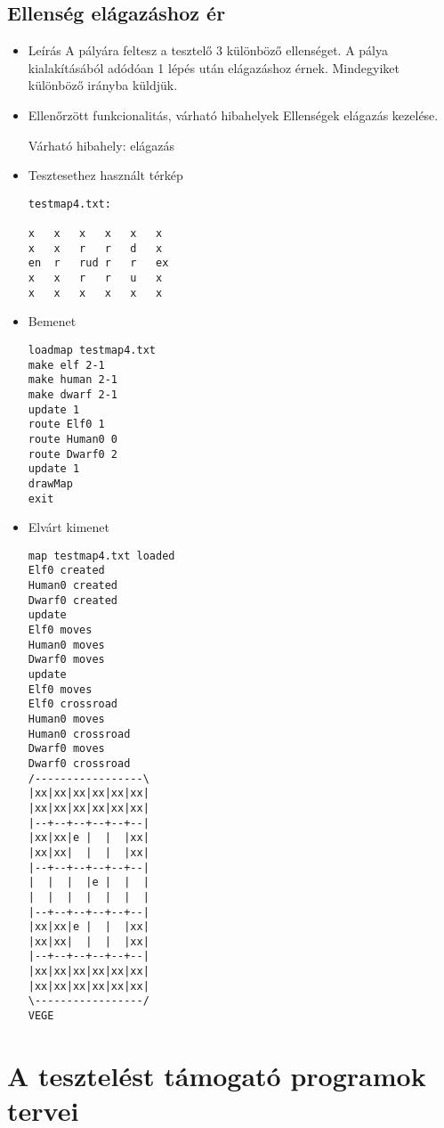 \subsection{Ellenség elágazáshoz ér}
\begin{itemize}
\item Leírás\newline
A pályára feltesz a tesztelő 3 különböző ellenséget. A pálya kialakításából adódóan 1 lépés után elágazáshoz érnek. Mindegyiket különböző irányba küldjük. 
\item Ellenőrzött funkcionalitás, várható hibahelyek\newline
Ellenségek elágazás kezelése.

Várható hibahely: elágazás
\item Tesztesethez használt térkép \newline
\begin{lstlisting}
testmap4.txt:

x	x	x	x	x	x
x	x	r	r	d	x
en	r	rud	r	r	ex
x	x	r	r	u	x
x	x	x	x	x	x
\end{lstlisting}
\item Bemenet\newline
\begin{lstlisting}
loadmap testmap4.txt
make elf 2-1
make human 2-1
make dwarf 2-1
update 1
route Elf0 1
route Human0 0
route Dwarf0 2
update 1
drawMap
exit
\end{lstlisting}
\item Elvárt kimenet\newline
\begin{lstlisting}
map testmap4.txt loaded
Elf0 created
Human0 created
Dwarf0 created
update
Elf0 moves
Human0 moves
Dwarf0 moves
update
Elf0 moves
Elf0 crossroad
Human0 moves
Human0 crossroad
Dwarf0 moves
Dwarf0 crossroad
/-----------------\
|xx|xx|xx|xx|xx|xx|
|xx|xx|xx|xx|xx|xx|
|--+--+--+--+--+--|
|xx|xx|e |  |  |xx|
|xx|xx|  |  |  |xx|
|--+--+--+--+--+--|
|  |  |  |e |  |  |
|  |  |  |  |  |  |
|--+--+--+--+--+--|
|xx|xx|e |  |  |xx|
|xx|xx|  |  |  |xx|
|--+--+--+--+--+--|
|xx|xx|xx|xx|xx|xx|
|xx|xx|xx|xx|xx|xx|
\-----------------/
VEGE
\end{lstlisting}
\end{itemize}

\section{A tesztelést támogató programok tervei}

